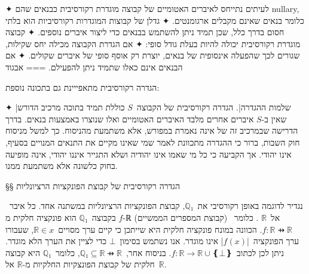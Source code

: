✦ לעיתים נתייחס לאיברים האטומיים של קבוצה מוגדרת רקורסיבית כבנאים שהם nullary,
כלומר בנאים שאינם מקבלים ארגומנטים.
✦ גדלן של קבוצות המוגדרות רקורסיביות הוא בלתי חסום בדרך כלל, שכן תמיד ניתן
להשתמש בבנאים כדי ליצור איברים נוספים.
✦ קבוצה מוגדרת רקורסיבית יכולה להיות בעלת גודל סופי:
✦ אם הגדרת הקבוצה מכילה יחס שקילות, שגורים לכך שהפעלה אינסופית של בנאים, יוצרת
רק אוסף סופי של איברים שקולים.
✦ אם הבנאים אינם כאלו שתמיד ניתן להפעילם.
===
{אבגוד}

הגדרה רקורסיבית מתאפייינת גם בתכונה נוספת:
\begin{itemize}
✦ \ע|שלמות ההגדרה|. הגדרה רקורסיבית של הקבוצה~$S$ כוללת תמיד בתוכה מרכיב
הדורש שאין ב-$S$ איברים אחרים מלבד האיברים האטומיים ואלו שנוצרו באמצעות בנאים.
בדרך הדרישה שבמרכיב זה של אינה נאמרת במפורש, אלא משתמעת מהניסוח. כך למשל מניסוח
חוק השבות, ברור כי ההגדרה מתכוונת לאמר שמי שאינו מקיים את התנאים המנויים בסעיף,
אינו יהודי. אך הקביעה כי כל מי שאמו אינו יהודיה ושלא התגייר איננו יהודי, אינה
מופיעה בחוק כלשונה אלא משתמעת ממנו.
\end{itemize}

§§ הגדרה רקורסיבית של קבוצת הפונקציות הרציונליות

נגדיר לדוגמה באופן רקורסיבי את~$ℚ₁$, קבוצת הפונקציות הרציונליות במשתנה אחד. כל
איבר~$f$ בקבוצה~$ℚ₁$ הוא פונקציה חלקית מ-ℝ (קבוצת המספרים הממשיים) אל~$ℝ$ .
כלומר~$f:ℝ⇸ℝ$. הכוונה במונח פונקציה חלקית היא שייתכן כי קיים ערך מסויים~$ℝ∈x$,
שעבורו ערך הפונקציה~\E|$f(x)$| אינו מוגדר. אנו נשתמש בסימון~$⊥$ כדי לציין את הערך
הלא מוגדר. ניתן לכן לכתוב~$f:ℝ→ℝ∪❴⊥❵$. בניסוח אחר,~$ℚ₁⊆ℝ⇸ℝ$, כלומר~$ℚ₁$ היא
קבוצה חלקית של קבוצת הפונצקיות החלקיות מ-$ℝ$ אל~$ℝ$.

